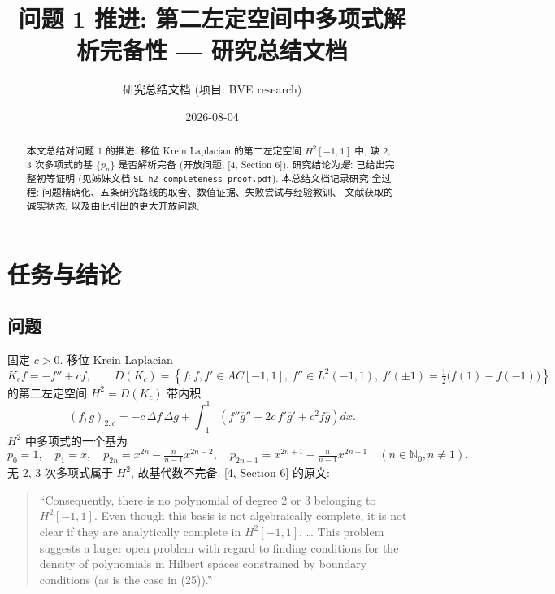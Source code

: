 \documentclass[UTF8]{ctexart}
\title{问题 1 推进: 第二左定空间中多项式解析完备性 --- 研究总结文档}
\author{研究总结文档 (项目: BVE research)}
\date{2026-08-04}
\begin{document}
\maketitle

\begin{abstract}
本文总结对问题 1 的推进: 移位 Krein Laplacian 的第二左定空间
$H^2[-1,1]$ 中, 缺 2, 3 次多项式的基 $\{p_n\}$ 是否解析完备
(开放问题, [4, Section 6]). 研究结论为\emph{是}: 已给出完整初等证明
(见姊妹文档 \texttt{SL\_h2\_completeness\_proof.pdf}). 本总结文档记录研究
全过程: 问题精确化、五条研究路线的取舍、数值证据、失败尝试与经验教训、
文献获取的诚实状态, 以及由此引出的更大开放问题.
\end{abstract}

\tableofcontents

\section{任务与结论}

\subsection{问题}

固定 $c > 0$. 移位 Krein Laplacian
\begin{equation}
	K_c f = -f'' + c f, \qquad
	D(K_c) = \left\{ f : f, f' \in AC[-1,1],\ f'' \in L^2(-1,1),\
		f'(\pm1) = \tfrac12\bigl(f(1)-f(-1)\bigr) \right\}
\end{equation}
的第二左定空间 $H^2 = D(K_c)$ 带内积
\begin{equation}
	(f,g)_{2,c} = -c\, \Delta f\, \overline{\Delta g}
		+ \int_{-1}^1 \left( f''\overline{g}'' + 2c\, f'\overline{g}' + c^2 f\overline{g} \right) dx .
\end{equation}
$H^2$ 中多项式的一个基为
\begin{equation}
	p_0 = 1, \quad p_1 = x, \quad
	p_{2n} = x^{2n} - \tfrac{n}{n-1}x^{2n-2}, \quad
	p_{2n+1} = x^{2n+1} - \tfrac{n}{n-1}x^{2n-1}
	\quad (n \in \mathbb{N}_0, n \neq 1).
\end{equation}
无 2, 3 次多项式属于 $H^2$, 故基代数不完备. [4, Section 6] 的原文:

\begin{quote}
``Consequently, there is no polynomial of degree 2 or 3 belonging to
$H^2[-1,1]$. Even though this basis is not algebraically complete, it is not
clear if they are analytically complete in $H^2[-1,1]$. \dots{} This problem
suggests a larger open problem with regard to finding conditions for the
density of polynomials in Hilbert spaces constrained by boundary conditions
(as is the case in (25)).''
\end{quote}
\end{document}
